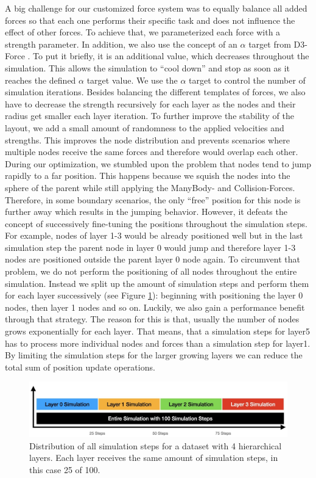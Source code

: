 A big challenge for our customized force system was to equally balance all added forces so that each one performs their specific task and does not influence the effect of other forces. To achieve that, we parameterized each force with a strength parameter.
In addition, we also use the concept of an $\alpha$ target from D3-Force \cite{bostock_d3forcejs_nodate}. To put it briefly, it is an additional value, which decreases throughout the simulation. This allows the simulation to “cool down” and stop as soon as it reaches the defined $\alpha$ target value. We use the $\alpha$ target to control the number of simulation iterations. 
Besides balancing the different templates of forces, we also have to decrease the strength recursively for each layer as the nodes and their radius get smaller each layer iteration.
To further improve the stability of the layout, we add a small amount of randomness to the applied velocities and strengths. This improves the node distribution and prevents scenarios where multiple nodes receive the same forces and therefore would overlap each other.
During our optimization, we stumbled upon the problem that nodes tend to jump rapidly to a far position. This happens because we squish the nodes into the sphere of the parent while still applying the ManyBody- and Collision-Forces. Therefore, in some boundary scenarios, the only “free” position for this node is further away which results in the jumping behavior. However, it defeats the concept of successively fine-tuning the positions throughout the simulation steps. For example, nodes of layer 1-3 would be already positioned well but in the last simulation step the parent node in layer 0 would jump and therefore layer 1-3 nodes are positioned outside the parent layer 0 node again. To circumvent that problem, we do not perform the positioning of all nodes throughout the entire simulation. Instead we split up the amount of simulation steps and perform them for each layer successively (see Figure \ref{fig:SimulationSteps}): beginning with positioning the layer 0 nodes, then layer 1 nodes and so on.
Luckily, we also gain a performance benefit through that strategy. 
The reason for this is that, usually the number of nodes grows exponentially for each layer. That means, that a simulation steps for layer5 has to process more individual nodes and forces than a simulation step for layer1. By limiting the simulation steps for the larger growing layers we can reduce the total sum of position update operations.
\begin{figure}[h]
    \centering
    \includegraphics[width=\textwidth]{graphics/simulationStepsSplit.jpg}
    \caption[Distribution of all simulation steps.]{Distribution of all simulation steps for a dataset with 4 hierarchical layers. Each layer receives the same amount of simulation steps, in this case 25 of 100.}
    \label{fig:SimulationSteps} 
  \end{figure}

